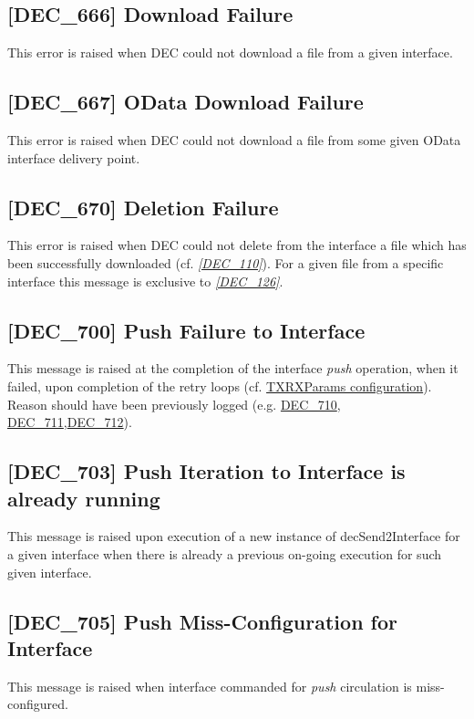 \documentclass[dec_sum_main.tex]{subfiles}
\begin{document}
\subsection{[DEC\_666] Download Failure}
\label{DEC666}
This error is raised when DEC could not download a file from a given interface.

\subsection{[DEC\_667] OData Download Failure}
\label{DEC666}
This error is raised when DEC could not download a file from some given OData interface delivery point.

\label{DEC670}
\subsection{[DEC\_670] Deletion Failure}
This error is raised when DEC could not delete from the interface a file which has been successfully downloaded (cf. \hyperref[DEC110]{\textit{[DEC\_110]}}).
For a given file from a specific interface this message is exclusive to \hyperref[DEC126]{\textit{[DEC\_126]}}.

\label{DEC700}
\subsection{[DEC\_700] Push Failure to Interface}
This message is raised at the completion of the interface \textit{push} operation, when it failed, upon completion of the retry loops (cf. \hyperref[TXRXParams]{TXRXParams configuration}). Reason should have been previously logged (e.g. \hyperref[DEC710]{DEC\_710}, \hyperref[DEC711]{DEC\_711},\hyperref[DEC712]{DEC\_712}). 

\label{DEC703}
\subsection{[DEC\_703]  Push Iteration to Interface is already running}
This message is raised upon execution of a new instance of decSend2Interface for a given interface when there is already a previous on-going execution for such given interface.

\label{DEC705}
\subsection{[DEC\_705] Push Miss-Configuration for Interface}
This message is raised when interface commanded for \textit{push} circulation is miss-configured.
\end{document}
